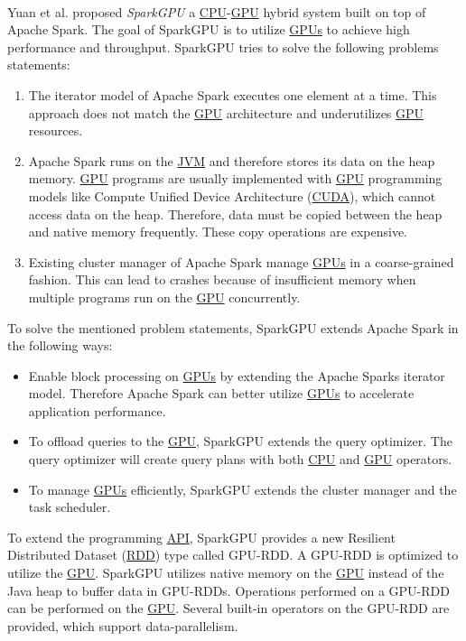 \paragraph{}
Yuan et al. \cite{Yuan2016SparkGPU} proposed \textit{SparkGPU} a \hyperlink{abbr:cpu}{CPU}-\hyperlink{abbr:gpu}{GPU} hybrid system built on top of Apache Spark.
The goal of SparkGPU is to utilize \hyperlink{abbr:gpu}{GPUs} to achieve high performance and throughput.
SparkGPU tries to solve the following problems statements:
\begin{enumerate}
\item The iterator model of Apache Spark executes one element at a time.
This approach does not match the \hyperlink{abbr:gpu}{GPU} architecture and underutilizes \hyperlink{abbr:gpu}{GPU} resources.

\item Apache Spark runs on the \hyperlink{abbr:jvm}{JVM} and therefore stores its data on the heap memory.
\hyperlink{abbr:gpu}{GPU} programs are usually implemented with \hyperlink{abbr:gpu}{GPU} programming models like Compute Unified Device Architecture (\hyperlink{abbr:cuda}{CUDA}), which cannot access data on the heap.
Therefore, data must be copied between the heap and native memory frequently. These copy operations are expensive.

\item Existing cluster manager of Apache Spark manage \hyperlink{abbr:gpu}{GPUs} in a coarse-grained fashion.
This can lead to crashes because of insufficient memory when multiple programs run on the \hyperlink{abbr:gpu}{GPU} concurrently.
\end{enumerate}
To solve the mentioned problem statements, SparkGPU extends Apache Spark in the following ways:
\begin{itemize}
\item Enable block processing on \hyperlink{abbr:gpu}{GPUs} by extending the Apache Sparks iterator model. Therefore Apache Spark can better utilize \hyperlink{abbr:gpu}{GPUs} to accelerate application performance.

\item To offload queries to the \hyperlink{abbr:gpu}{GPU}, SparkGPU extends the query optimizer. The query optimizer will create query plans with both \hyperlink{abbr:cpu}{CPU} and \hyperlink{abbr:gpu}{GPU} operators.

\item To manage \hyperlink{abbr:gpu}{GPUs} efficiently, SparkGPU extends the cluster manager and the task scheduler.
\end{itemize}
To extend the programming \hyperlink{abbr:api}{API}, SparkGPU provides a new Resilient Distributed Dataset (\hyperlink{abbr:rdd}{RDD}) type called GPU-RDD.
A GPU-RDD is optimized to utilize the \hyperlink{abbr:gpu}{GPU}.
SparkGPU utilizes native memory on the \hyperlink{abbr:gpu}{GPU} instead of the Java heap to buffer data in GPU-RDDs.
Operations performed on a GPU-RDD can be performed on the \hyperlink{abbr:gpu}{GPU}. Several built-in operators on the GPU-RDD are provided, which support data-parallelism.


